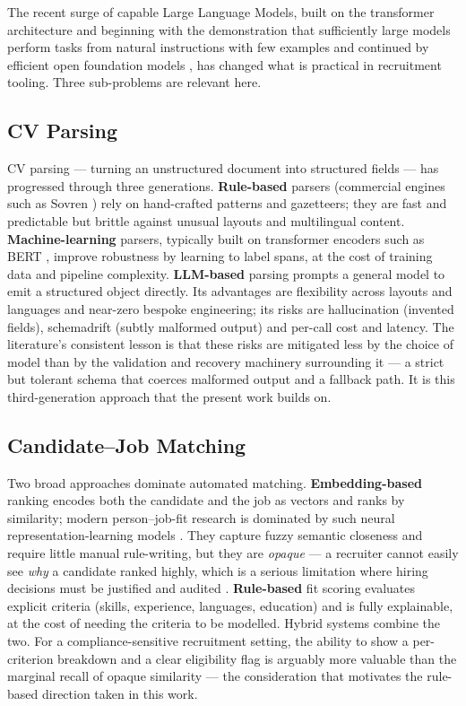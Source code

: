 The recent surge of capable Large Language Models, built on the transformer
architecture \parencite{Vaswani2017} and beginning with the
demonstration that sufficiently large models perform tasks from natural
instructions with few examples \parencite{Brown2020GPT3} and continued by
efficient open foundation models \parencite{Touvron2023Llama}, has changed
what is practical in recruitment tooling. Three sub-problems are relevant
here.

\subsection{CV Parsing}
\label{sec:sota-cv}

CV parsing --- turning an unstructured document into structured fields ---
has progressed through three generations. \textbf{Rule-based} parsers
(commercial engines such as Sovren \parencite{Sovren}) rely on hand-crafted
patterns and gazetteers; they are fast and predictable but brittle against
unusual layouts and multilingual content. \textbf{Machine-learning} parsers,
typically built on transformer encoders such as BERT
\parencite{Devlin2019BERT}, improve robustness by
learning to label spans, at the cost of training data and pipeline
complexity. \textbf{LLM-based} parsing prompts a
general model to emit a structured object directly. Its advantages are
flexibility across layouts and languages and near-zero bespoke engineering;
its risks are \gls{hallucination} (invented fields), \gls{schemadrift} (subtly malformed
output) and per-call cost and latency. The literature's consistent lesson is
that these risks are mitigated less by the choice of model than by the
validation and recovery machinery surrounding it --- a strict but tolerant
schema that coerces malformed output and a fallback path. It
is this third-generation approach that the present work builds on.

\subsection{Candidate--Job Matching}
\label{sec:sota-matching}

Two broad approaches dominate automated matching. \textbf{Embedding-based}
ranking encodes both the candidate and the job as vectors and ranks by
similarity; modern person--job-fit research is dominated by such neural
representation-learning models
\parencite{Qin2018PersonJobFit,Jiang2020PersonJobFit}. They capture fuzzy
semantic closeness and require little manual rule-writing, but they are
\emph{opaque} --- a recruiter cannot easily see
\emph{why} a candidate ranked highly, which is a serious limitation where
hiring decisions must be justified and audited \parencite{Raghavan2020}.
\textbf{Rule-based} fit
scoring evaluates explicit criteria (skills, experience, languages,
education) and is fully explainable, at the cost of needing the criteria to
be modelled. Hybrid systems combine the two. For a compliance-sensitive
recruitment setting, the ability to show a per-criterion breakdown and a clear
eligibility flag is arguably more valuable than the marginal recall of opaque
similarity --- the consideration that motivates the rule-based direction taken
in this work.

